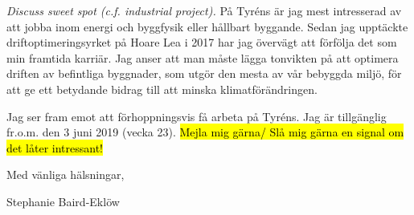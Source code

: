 \documentclass[11pt,a4paper,roman]{moderncv}        %
\begin{document}
\textit{Discuss sweet spot (c.f. industrial project).}
P{\aa} Tyr{\'e}ns {\"a}r jag mest intresserad av att jobba inom energi och byggfysik eller h{\aa}llbart byggande.
Sedan jag uppt{\"a}ckte driftoptimeringsyrket p{\aa} Hoare Lea i 2017 har jag {\"o}verv{\"a}gt att f{\"o}rf{\"o}lja det som min framtida karri{\"a}r.
Jag anser att man m{\aa}ste l{\"a}gga tonvikten p{\aa} att optimera driften av befintliga byggnader, som utg{\"o}r den mesta av v{\aa}r bebyggda milj{\"o}, f{\"o}r att ge ett betydande bidrag till att minska klimatf{\"o}r{\"a}ndringen.


Jag ser fram emot att f{\"o}rhoppningsvis f{\aa} arbeta p{\aa} Tyr{\'e}ns.
Jag {\"a}r tillg{\"a}nglig fr.o.m. den 3 juni 2019 (vecka 23).
\hl{Mejla mig g{\"a}rna/ Sl{\aa} mig g{\"a}rna en signal om det l{\aa}ter intressant!}

Med v{\"a}nliga h{\"a}lsningar,


Stephanie Baird-Ekl{\"o}w


\end{document}
